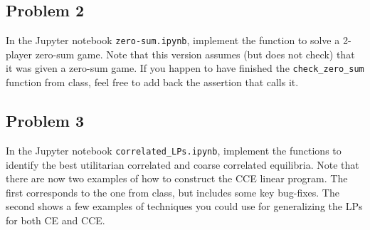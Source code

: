 \documentclass[11pt]{article}
\begin{document}
\subsection*{Problem 2}

In the Jupyter notebook \texttt{zero-sum.ipynb}, implement the function to solve a 2-player zero-sum game.
Note that this version assumes (but does not check) that it was given a zero-sum game.
If you happen to have finished the \texttt{check\_zero\_sum} function from class, feel free to add back the assertion that calls it.




\subsection*{Problem 3}


In the Jupyter notebook \texttt{correlated\_LPs.ipynb}, implement the functions to identify the best utilitarian correlated and coarse correlated equilibria.
Note that there are now two examples of how to construct the CCE linear program.
The first corresponds to the one from class, but includes some key bug-fixes.
The second shows a few examples of techniques you could use for generalizing the LPs for both CE and CCE.
\end{document}
